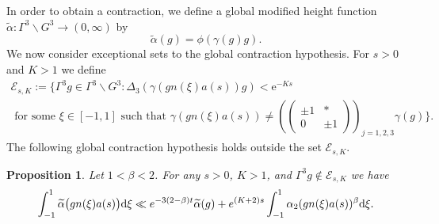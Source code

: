 \documentclass[12pt]{amsart}
\newtheorem{prop}[thm]{Proposition}
\theoremstyle{definition}
\theoremstyle{remark}
\numberwithin{equation}{section}
\newcommand{\dd}{\mathrm{d}}
\newcommand{\e}{\mathrm{e}}
\begin{document}
In order to obtain a contraction, we define a global modified height function $\widetilde{\alpha}: \Gamma^3 \backslash G^3 \to (0,\infty)$ by
\begin{equation}
  \label{eq:tildealphadef1}
  \widetilde{\alpha}(g) = \phi(\gamma(g)g).
\end{equation}
We now consider exceptional sets to the global contraction hypothesis.
For $s>0$ and $K>1$ we define
\begin{multline}
  \label{eq:cEdef}
  \mathcal{E}_{s,K}:=\bigg\{\Gamma^3 g\in \Gamma^3 \backslash G^3: \Delta_3(\gamma(gn(\xi)a(s)) g)<\e^{-Ks} \\
  \textrm{ for some } 
  \xi \in [-1,1] \textrm{ such that }  \gamma(gn(\xi)a(s)) \neq \left(\begin{pmatrix}    \pm 1 & * \\
    0 & \pm 1
  \end{pmatrix}
  \right)_{\!\! j=1,2,3} \gamma(g)
  \bigg\}.
\end{multline}
The following global contraction hypothesis holds outside the set $\mathcal{E}_{s,K}$.
\begin{prop}
  \label{prop:globalcontraction}
  Let $1<\beta<2$.
  For any $s>0$, $K>1$, and $\Gamma^3 g \notin \mathcal{E}_{s,K}$ we have
  \begin{equation}
    \label{eq:globalcontraction}
    \int_{-1}^1\widetilde{\alpha}\big(gn(\xi)a(s)\big)\dd\xi \\
    \ll  e^{-3(2-\beta) t}\widetilde{\alpha}(g)+e^{(K+2)s}\int_{-1}^{1} \alpha_{2}(gn(\xi)a(s))^{\beta}\dd \xi.
  \end{equation}
\end{prop}
\end{document}
